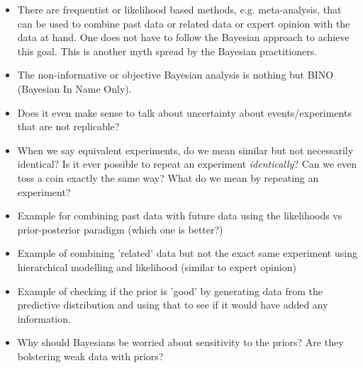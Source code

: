\documentclass[10pt]{beamer}
\begin{document}
\begin{frame}
\begin{itemize}
\item There are frequentist or likelihood based methods, e.g. meta-analysis, that can be used to combine past data or related data or expert opinion with the data at hand. One does not have to follow the Bayesian approach to achieve this goal. This is another myth spread by the Bayesian practitioners. 
\pause
\item The non-informative or objective Bayesian analysis is nothing but BINO (Bayesian In Name Only). 
\end{itemize}
\end{frame}





\begin{frame}
\begin{itemize}
\item Does it even make sense to talk about uncertainty about events/experiments that are not replicable? 
\item When we say equivalent experiments, do we mean similar but not necessarily identical? Is it ever possible to repeat an experiment \emph{identically}? Can we even toss a coin exactly the same way? What do we mean by repeating an experiment?
\item Example for combining past data with future data using the likelihoods vs prior-posterior paradigm (which one is better?)
\item Example of combining 'related' data but not the exact same experiment using hierarchical modelling and likelihood (similar to expert opinion)
\item Example of checking if the prior is 'good' by generating data from the predictive distribution and using that to see if it would have added any information.
\item Why should Bayesians be worried about sensitivity to the priors? Are they bolstering weak data with priors?
\end{itemize}
\end{frame}
\end{document}
